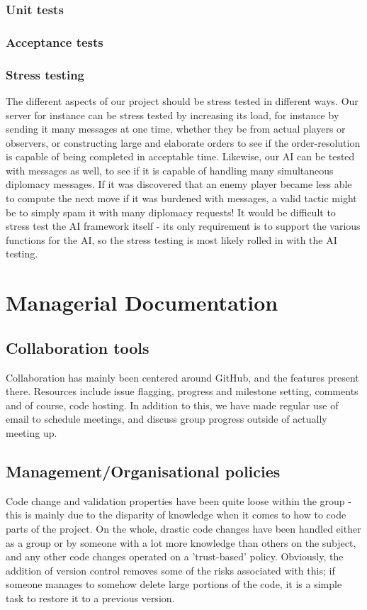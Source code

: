 \documentclass[11pt]{article}
\begin{document}
\subsubsection{Unit tests}

\subsubsection{Acceptance tests}


\subsubsection{Stress testing}
The different aspects of our project should be stress tested in different ways.
Our server for instance can be stress tested by increasing its load, for 
instance by sending it many messages at one time, whether they be from actual
players or observers, or constructing large and elaborate orders to see if the
order-resolution is capable of being completed in acceptable time. Likewise, our
AI can be tested with messages as well, to see if it is capable of handling many
simultaneous diplomacy messages. If it was discovered that an enemy player 
became less able to compute the next move if it was burdened with messages, a 
valid tactic might be to simply spam it with many diplomacy requests! It would
be difficult to stress test the AI framework itself - its only requirement is to
support the various functions for the AI, so the stress testing is most likely
rolled in with the AI testing. 

\section{Managerial Documentation}

\subsection{Collaboration tools}
Collaboration has mainly been centered around GitHub, and the features present
there. Resources include issue flagging, progress and milestone setting, comments 
and of course, code hosting. In addition to this, we have made regular use of 
email to schedule meetings, and discuss group progress outside of actually 
meeting up.

\subsection{Management/Organisational policies}
Code change and validation properties have been quite loose within the group - 
this is mainly due to the disparity of knowledge when it comes to how to code 
parts of the project. On the whole, drastic code changes have been handled 
either as a group or by someone with a lot more knowledge than others on the 
subject, and any other code changes operated on a 'trust-based' policy. 
Obviously, the addition of version control removes some of the risks associated
with this; if someone manages to somehow delete large portions of the code, it
is a simple task to restore it to a previous version.
\end{document}
